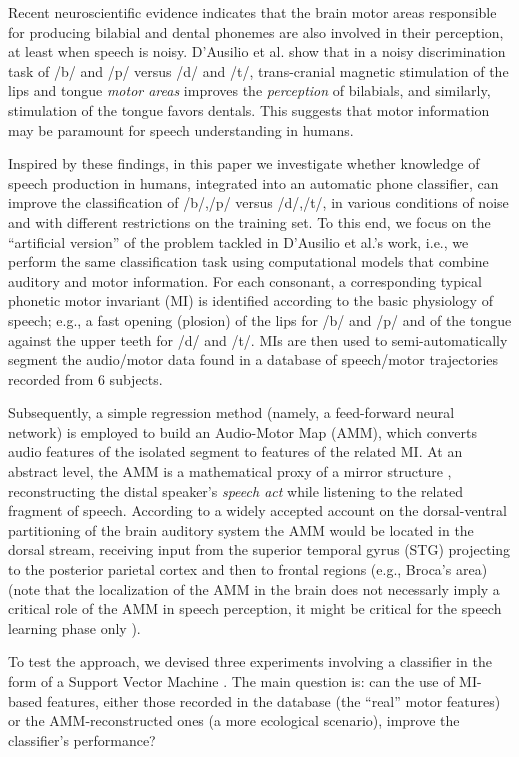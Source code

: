 \documentclass[10pt]{article}
\begin{document}
Recent neuroscientific evidence indicates that the brain motor areas responsible for
producing bilabial and dental phonemes are also involved in their perception, at least
when speech is noisy. D'Ausilio et al. \cite{dausilio}
show that in a noisy discrimination task of /b/ and /p/ versus /d/
and /t/, trans-cranial magnetic stimulation of the lips and tongue \emph{motor areas}
improves the \emph{perception} of bilabials, and similarly, stimulation of the tongue
favors dentals. This suggests that motor information may be paramount for
speech understanding in humans.

Inspired by these findings, in this paper we investigate whether knowledge of speech
production in humans, integrated into an automatic phone classifier, can improve the
classification of /b/,/p/ versus /d/,/t/, in various conditions of noise and with different
restrictions on the training set.
To this end, we focus on the ``artificial version'' of the problem tackled in D'Ausilio et al.'s
work, i.e., we perform the same classification task using computational models that combine 
auditory and motor information. For each consonant, a corresponding typical phonetic motor invariant (MI) is identified
according to the basic physiology of speech; e.g., a fast opening (plosion) of the lips
for /b/ and /p/ and of the tongue against the upper teeth for /d/ and /t/.
MIs are then used to semi-automatically segment the audio/motor data found in a
database of speech/motor trajectories recorded from $6$ subjects.

Subsequently, a simple regression method (namely, a feed-forward neural network) is employed
to build an Audio-Motor Map (AMM), which converts audio features of the isolated segment to
features of the related MI. At an abstract level, the AMM is a mathematical proxy of a mirror
structure \cite{umilta-01,kroger}, reconstructing the distal speaker's \emph{speech act} while
listening to the related fragment of speech. According to a widely accepted account on the 
dorsal-ventral partitioning of the brain auditory system \cite{hickok-00,hickok-04} the AMM would be located 
in the dorsal stream, receiving input from the superior temporal gyrus (STG) projecting to the posterior 
parietal cortex and then to frontal regions (e.g., Broca's area) (note that the localization of the AMM in 
the brain does not necessarly imply a critical role of the AMM in speech perception, it might 
be critical for the speech learning phase only \cite{hickok-04,hickok-11}).

To test the approach, we devised three experiments involving a classifier in the form of a
Support Vector Machine \cite{BGV92}. The main question is: can the use of MI-based features,
either those recorded in the database (the ``real'' motor features) or the AMM-reconstructed
ones (a more ecological scenario), improve the classifier's performance?
\end{document}
